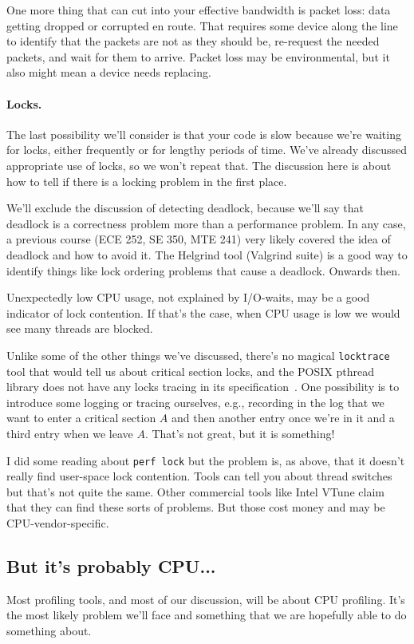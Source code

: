 One more thing that can cut into your effective bandwidth is packet loss: data getting dropped or corrupted en route. That requires some device along the line to identify that the packets are not as they should be, re-request the needed packets, and wait for them to arrive. Packet loss may be environmental, but it also might mean a device needs replacing.

\paragraph{Locks.}
The last possibility we'll consider is that your code is slow because we're waiting for locks, either frequently or for lengthy periods of time. We've already discussed appropriate use of locks, so we won't repeat that. The discussion here is about how to tell if there is a locking problem in the first place.

We'll exclude the discussion of detecting deadlock, because we'll say that deadlock is a correctness problem more than a performance problem. In any case, a previous course (ECE 252, SE 350, MTE 241) very likely covered the idea of deadlock and how to avoid it. The Helgrind tool (Valgrind suite) is a good way to identify things like lock ordering problems that cause a deadlock. Onwards then. 

Unexpectedly low CPU usage, not explained by I/O-waits, may be a good indicator of lock contention. If that's the case, when CPU usage is low we would see many threads are blocked. 

Unlike some of the other things we've discussed, there's no magical \texttt{locktrace} tool that would tell us about critical section locks, and the POSIX pthread library does not have any locks tracing in its specification~\cite{usd}. One possibility is to introduce some logging or tracing ourselves, e.g., recording in the log that we want to enter a critical section $A$ and then another entry once we're in it and a third entry when we leave $A$. That's not great, but it is something! 

I did some reading about \texttt{perf lock} but the problem is, as above, that it doesn't really find user-space lock contention. Tools can tell you about thread switches but that's not quite the same. Other commercial tools like Intel VTune claim that they can find these sorts of problems. But those cost money and may be CPU-vendor-specific.


\subsection*{But it's probably CPU...}
Most profiling tools, and most of our discussion, will be about CPU profiling. It's the most likely problem we'll face and something that we are hopefully able to do something about. 






